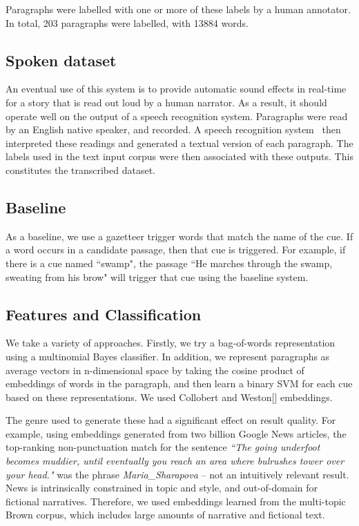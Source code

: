 \documentclass[11pt]{article}
\begin{document}
Paragraphs were labelled with one or more of these labels by a human annotator.
In total, 203 paragraphs were labelled, with 13884 words.

\subsection{Spoken dataset}
An eventual use of this system is to provide automatic sound effects in real-time for a story that is read out loud by a human narrator.
As a result, it should operate well on the output of a speech recognition system.
Paragraphs were read by an English native speaker, and recorded.
A speech recognition system~\cite{lamere2003design} then interpreted these readings and generated a textual version of each paragraph.
The labels used in the text input corpus were then associated with these outputs.
This constitutes the transcribed dataset.

\subsection{Baseline}
As a baseline, we use a gazetteer trigger words that match the name of the cue.
If a word occurs in a candidate passage, then that cue is triggered.
For example, if there is a cue named ``swamp", the passage ``He marches through the swamp, sweating from his brow" will trigger that cue using the baseline system.

\subsection{Features and Classification}

We take a variety of approaches.
Firstly, we try a bag-of-words representation using a multinomial Bayes classifier.
In addition, we represent paragraphs as average vectors in n-dimensional space by taking the cosine product of embeddings of words in the paragraph, and then learn a binary SVM for each cue based on these representations.
We used Collobert and Weston[] embeddings.

The genre used to generate these had a significant effect on result quality.
For example, using embeddings generated from two billion Google News articles, the top-ranking non-punctuation match for the sentence \emph{``The going underfoot becomes muddier, until eventually you reach an area where bulrushes tower over your head."} was the phrase {\em Maria\_Sharapova} -- not an intuitively relevant result.
News is intrinsically constrained in topic and style, and out-of-domain for fictional narratives.
Therefore, we used embeddings learned from the multi-topic Brown corpus, which includes large amounts of narrative and fictional text.
\end{document}
